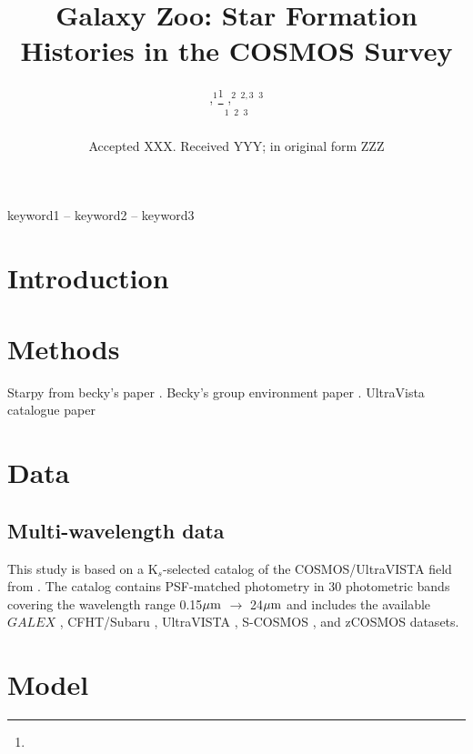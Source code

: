 \documentclass[a4paper,fleqn,usenatbib]{mnras}
\title[COSMOS SFHs]{Galaxy Zoo: Star Formation Histories in the COSMOS Survey}
\author[]{
,$^{1}$\thanks{}
,$^{2}$
$^{2,3}$
$^{3}$
\\
$^{1}$
$^{2}$
$^{3}$
}
\date{Accepted XXX. Received YYY; in original form ZZZ}
\begin{document}
\label{firstpage}
\pagerange{\pageref{firstpage}--\pageref{lastpage}}
\maketitle

\begin{abstract}


\end{abstract}

\begin{keywords}
keyword1 -- keyword2 -- keyword3
\end{keywords}



\section{Introduction}

\section{Methods}

Starpy from becky's paper \cite{smethurst2015galaxy}.
Becky's group environment paper \cite{smethurst2017galaxy}.
UltraVista catalogue paper \cite{muzzin2013public}
\section{Data}
   
   \subsection{Multi-wavelength data}
   
   This study is based on a K$_{s}$-selected catalog of the COSMOS/UltraVISTA field from \cite{muzzin2013public}.  
   The catalog contains PSF-matched photometry in 30 photometric bands covering the wavelength range 0.15$\hbox{$\mu$m}$ 
   $\rightarrow$ 24$\hbox{$\mu$m}$ and includes the available $GALEX$ \citep{martin2005}, CFHT/Subaru \citep{capak2007}, 
   UltraVISTA \citep{mcCraken2012}, S-COSMOS \citep{sanders2007}, and zCOSMOS \citep{lilly2009} datasets.

\section{Model}
\end{document}
